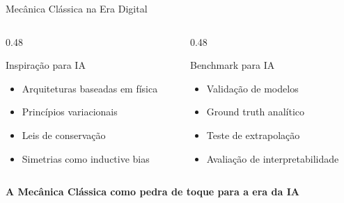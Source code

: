 \documentclass[aspectratio=169,12pt]{beamer}
\begin{document}
\begin{frame}{Mecânica Clássica na Era Digital}
    \begin{columns}[T]
        \begin{column}{0.48\textwidth}
            \begin{block}{Inspiração para IA}
                \begin{itemize}
                    \item Arquiteturas baseadas em física
                    \item Princípios variacionais
                    \item Leis de conservação
                    \item Simetrias como inductive bias
                \end{itemize}
            \end{block}
        \end{column}
        \begin{column}{0.48\textwidth}
            \begin{block}{Benchmark para IA}
                \begin{itemize}
                    \item Validação de modelos
                    \item Ground truth analítico
                    \item Teste de extrapolação
                    \item Avaliação de interpretabilidade
                \end{itemize}
            \end{block}
        \end{column}
    \end{columns}

    \vspace{0.5cm}

    \begin{center}
        \textbf{A Mecânica Clássica como pedra de toque para a era da IA}
    \end{center}
\end{frame}
\end{document}
